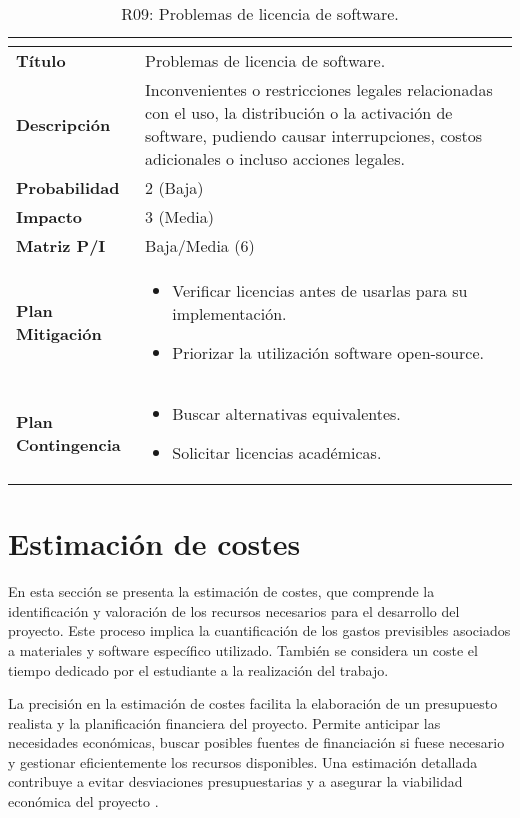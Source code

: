 \begin{table}[H]
\centering
\begin{tabular}{|>{\bfseries}l|p{10cm}|}
\hline
\rowcolor{lightgray}
\multicolumn{2}{|c|}{\textbf{Riesgo R09}} \\ \hline
Título & Problemas de licencia de software.\\ \hline
Descripción & Inconvenientes o restricciones legales relacionadas con el uso, la distribución o la activación de software, pudiendo causar interrupciones, costos adicionales o incluso acciones legales. \\ \hline
Probabilidad & 2 (Baja) \cellcolor{greenrisk} \\ \hline
Impacto & 3 (Media)  \cellcolor{yellowrisk}\\ \hline
Matriz P/I & Baja/Media (6)\\ \hline
Plan Mitigación & 
\begin{itemize}
\item Verificar licencias antes de usarlas para su implementación.
\item Priorizar la utilización software open-source.
\end{itemize} \\ \hline
Plan Contingencia & 
\begin{itemize}
\item Buscar alternativas equivalentes.
\item Solicitar licencias académicas.
\end{itemize} \\ \hline
\end{tabular}
\caption{R09: Problemas de licencia de software.}
\label{tab:R09}
\end{table}


\section{Estimación de costes}\label{sec.estcostes}
En esta sección se presenta la estimación de costes, que comprende la identificación y valoración de los recursos necesarios para el desarrollo del proyecto. Este proceso implica la cuantificación de los gastos previsibles asociados a materiales y software específico utilizado. También se considera un coste el tiempo dedicado por el estudiante a la realización del trabajo.

La precisión en la estimación de costes facilita la elaboración de un presupuesto realista y la planificación financiera del proyecto. Permite anticipar las necesidades económicas, buscar posibles fuentes de financiación si fuese necesario y gestionar eficientemente los recursos disponibles. Una estimación detallada contribuye a evitar desviaciones presupuestarias y a asegurar la viabilidad económica del proyecto \cite{oliveros2011gestion}.

